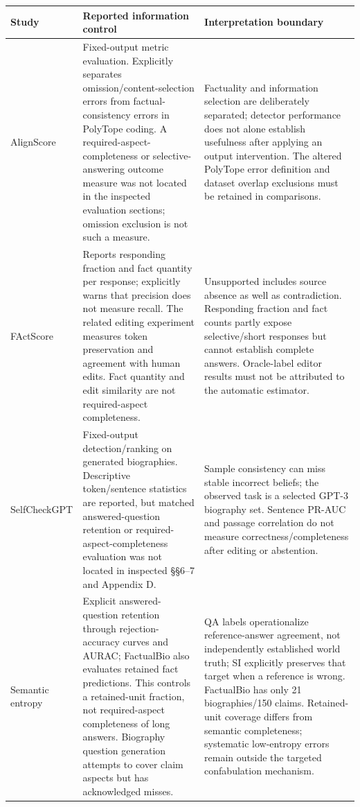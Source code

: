 \begin{table}[tp]
\centering\small\setlength{\tabcolsep}{5pt}\renewcommand{\arraystretch}{1.12}
\begin{tabularx}{\textwidth}{@{}>{\raggedright\arraybackslash}p{}>{\raggedright\arraybackslash}p{}>{\raggedright\arraybackslash}X@{}}\toprule
Study & Reported information control & Interpretation boundary \\ \midrule
AlignScore \citep{zha-etal-2023-alignscore} & Fixed-output metric evaluation. Explicitly separates omission/content-selection errors from factual-consistency errors in PolyTope coding. A required-aspect-completeness or selective-answering outcome measure was not located in the inspected evaluation sections; omission exclusion is not such a measure. & Factuality and information selection are deliberately separated; detector performance does not alone establish usefulness after applying an output intervention. The altered PolyTope error definition and dataset overlap exclusions must be retained in comparisons. \\
FActScore \citep{min-etal-2023-factscore} & Reports responding fraction and fact quantity per response; explicitly warns that precision does not measure recall. The related editing experiment measures token preservation and agreement with human edits. Fact quantity and edit similarity are not required-aspect completeness. & Unsupported includes source absence as well as contradiction. Responding fraction and fact counts partly expose selective/short responses but cannot establish complete answers. Oracle-label editor results must not be attributed to the automatic estimator. \\
SelfCheckGPT \citep{manakul-etal-2023-selfcheckgpt} & Fixed-output detection/ranking on generated biographies. Descriptive token/sentence statistics are reported, but matched answered-question retention or required-aspect-completeness evaluation was not located in inspected \S{}\S{}6--7 and Appendix D. & Sample consistency can miss stable incorrect beliefs; the observed task is a selected GPT-3 biography set. Sentence PR-AUC and passage correlation do not measure correctness/completeness after editing or abstention. \\
Semantic entropy \citep{extsemanticentropy2024} & Explicit answered-question retention through rejection-accuracy curves and AURAC; FactualBio also evaluates retained fact predictions. This controls a retained-unit fraction, not required-aspect completeness of long answers. Biography question generation attempts to cover claim aspects but has acknowledged misses. & QA labels operationalize reference-answer agreement, not independently established world truth; SI explicitly preserves that target when a reference is wrong. FactualBio has only 21 biographies/150 claims. Retained-unit coverage differs from semantic completeness; systematic low-entropy errors remain outside the targeted confabulation mechanism. \\

\end{tabularx}
\end{table}
